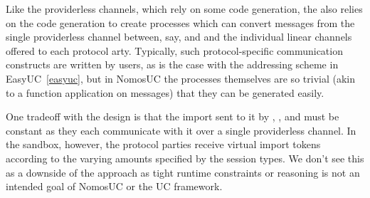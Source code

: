 Like the providerless channels, which rely on some code generation, the \partywrapper also relies on the code generation to create processes which can convert messages from the single providerless channel between, say, \partywrapper and \F  and the individual linear channels offered to each protocol arty.
Typically, such protocol-specific communication constructs are written by users, as is the case with the addressing scheme in EasyUC~\ref{easyuc}, but in NomosUC the processes themselves are so trivial (akin to a function application on messages) that they can be generated easily.

One tradeoff with the \partywrapper design is that the import sent to it by \F, \Z, and \A must be constant as they each communicate with it over a single providerless channel.  
In the sandbox, however, the protocol parties receive virtual import tokens according to the varying amounts specified by the session types.
We don't see this as a downside of the approach as tight runtime constraints or reasoning is not an intended goal of NomosUC or the UC framework.



